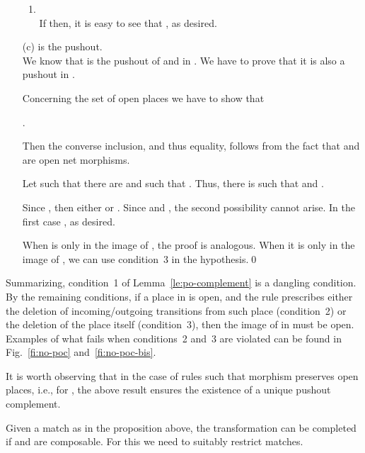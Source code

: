 \documentclass{LMCS}
\begin{document}
\begin{enumerate}[({a}.1)]
\begin{enumerate}[]
    \item \\
      If  then, it is easy to see that , as desired.
    \end{enumerate}
    
    \medskip

  \item[(c)]  is the pushout.\\
    We know that  is the pushout of  and  in . We have to prove
    that it is also a pushout in . 
  
    Concerning the set of open places we have to show that
    \begin{center}
      .
    \end{center}
    Then the converse inclusion, and thus equality, follows from the
    fact that  and  are open net morphisms.

    Let  such that there are  and  such
    that . Thus, there is  such that
     and .
    
    Since , then either  or . Since  and , the second
    possibility cannot arise. In the first case , as
    desired.

    When  is only in the image of , the proof is analogous. When it is
    only in the image of , we can use condition~3 in the hypothesis.\qed
  \end{enumerate}

\noindent Summarizing, condition~1 of Lemma~\ref{le:po-complement} is
a dangling condition.  By the remaining conditions, if a place  in
 is open, and the rule prescribes either the deletion of
incoming/outgoing transitions from such place (condition~2) or the
deletion of the place itself (condition~3), then the image of  in
 must be open.  Examples of what fails when conditions~2 and~3 are
violated can be found in Fig.~\ref{fi:no-poc} and~\ref{fi:no-poc-bis}.

It is worth observing that in the case of rules  such that morphism
 preserves open places, i.e.,  for , the above result ensures the
existence of a unique pushout complement.

Given a match  as in the proposition above, the
transformation can be completed if  and  are composable. For this we need to suitably restrict matches.
\end{document}
